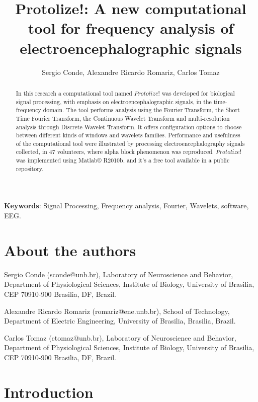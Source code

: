 \documentclass[12pt, a4paper]{article}
\begin{document}
\title{Protolize!: A new computational tool for frequency analysis of electroencephalographic signals}
\author{Sergio Conde, Alexandre Ricardo Romariz, Carlos Tomaz}
\date{}
\maketitle

\begin{abstract}

In this research a computational tool named $Protolize!$ was developed for biological signal processing, with emphasis on electroencephalographic signals, in the time-frequency domain. The tool performs analysis using the Fourier Transform, the Short Time Fourier Transform, the Continuous Wavelet Transform and multi-resolution analysis through Discrete Wavelet Transform. It offers configuration options to choose between different kinds of windows and wavelets families. Performance and usefulness of the computational tool were illustrated by processing electroencephalography signals collected, in 47 volunteers, where alpha block phenomenon was reproduced. $Protolize!$ was implemented using Matlab® R2010b, and it’s a free tool available in a public repository.

\end{abstract}

\textbf{Keywords}: Signal Processing, Frequency analysis, Fourier, Wavelets, software, EEG.

\section{About the authors}

Sergio Conde (sconde@unb.br), Laboratory of Neuroscience and Behavior, Department of Physiological Sciences, Institute of Biology, University of Brasilia, CEP 70910-900 Brasilia, DF,  Brazil.

Alexandre Ricardo Romariz (romariz@ene.unb.br), School of Technology, Department of Electric Engineering, University of Brasilia, Brasilia, Brazil.

Carlos Tomaz (ctomaz@unb.br), Laboratory of Neuroscience and Behavior, Department of Physiological Sciences, Institute of Biology, University of Brasilia, CEP 70910-900 Brasilia, DF,  Brazil.

\section{Introduction}
\end{document}

